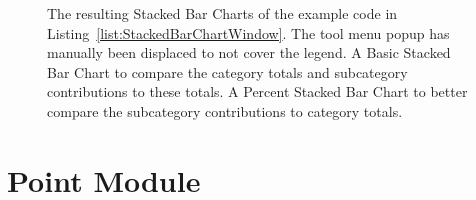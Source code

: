 \begin{figure}[tp]
\centering
{}
\hspace{1cm}
\caption[Stacked Bar Chart Window Example]{%
  The resulting Stacked Bar Charts of the example code in Listing~\ref{list:StackedBarChartWindow}. 
  The tool menu popup has manually been displaced to not cover the legend.
   A Basic Stacked Bar Chart to compare the category totals and subcategory contributions to these totals.
   A Percent Stacked Bar Chart to better compare the subcategory contributions to category totals. 
}
\label{fig:StackedBarChartWindow}
\end{figure}
  


\section{Point Module}

